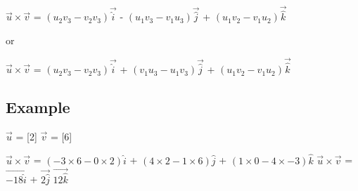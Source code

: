 \documentclass[12pt]{article}
\begin{document}
\begin{center}
    $\Vec{u} \times \Vec{v}$ = $(u_2v_3 - v_2v_3)\Vec{\hat{i}}$ - $(u_1v_3 - v_1u_3)\Vec{\hat{j}}$ + $(u_1v_2 - v_1u_2)\Vec{\hat{k}}$

    or
    
    $\Vec{u} \times \Vec{v}$ = $(u_2v_3 - v_2v_3)\Vec{\hat{i}}$ + $(v_1u_3 - u_1v_3)\Vec{\hat{j}}$ + $(u_1v_2 - v_1u_2)\Vec{\hat{k}}$
\end{center}

\subsection{Example}

$\Vec{u}$ = [2] $\Vec{v}$ = [6]

$\Vec{u} \times \Vec{v}$ = 
$(-3 \times 6 - 0 \times 2)\hat{i}$ +
$(4 \times 2 - 1 \times 6)\hat{j}$ +
$(1 \times 0 - 4 \times -3)\hat{k}$
$\Vec{u} \times \Vec{v}$ = $\Vec{-18\hat{i}}$ + $\Vec{2\hat{j}}$ $\Vec{12\hat{k}}$
\end{document}
